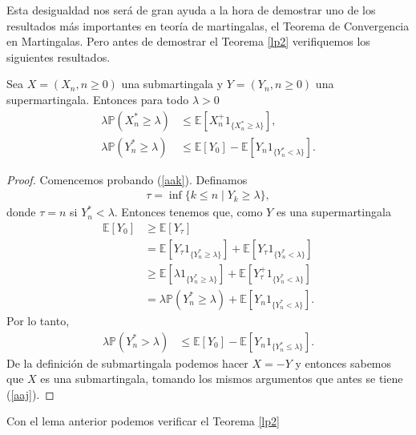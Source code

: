 Esta desigualdad nos será de gran ayuda a la hora de demostrar uno de los resultados más importantes en teoría de martingalas, el Teorema de Convergencia en Martingalas. Pero antes de demostrar el Teorema \ref{lp2} verifiquemos los siguientes resultados.

\begin{lemma}
\label{lemdes2}

Sea $X = (X_n, n \geq 0)$ una submartingala y $Y = (Y_n, n \geq 0)$ una supermartingala. Entonces para todo $\lambda > 0$
	\begin{align}
		\lambda  \mathbb{P}(X_n^{*} \geq \lambda) & \leq \mathbb{E}[X_n^{+} 1_{\{X_n^{*} \geq \lambda\}}] \label{aaj}, \\
		\lambda \mathbb{P}(Y_n^{*} \geq \lambda) & \leq \mathbb{E}[Y_0] - \mathbb{E}[Y_n 1_{\{Y_n^{*} < \lambda\}}]. \label{aak}
	\end{align}
\end{lemma}
\begin{proof}
Comencemos probando (\ref{aak}). Definamos
	\begin{align*}
	\tau = \inf \{k \leq n \mid Y_k \geq \lambda\},
	\end{align*}
donde $\tau = n$ si $Y_n^{*} < \lambda$. Entonces tenemos que, como $Y$ es una supermartingala
	\begin{align*}
	\mathbb{E}[Y_0] & \geq \mathbb{E}[Y_{\tau}] \\
	& = \mathbb{E}[Y_{\tau} 1_{\{Y_n^{*} \geq \lambda\}}] + \mathbb{E}[Y_{\tau} 1_{\{Y_n^{*} < \lambda\}}] \\
	& \geq \mathbb{E}[\lambda 1_{\{Y_n^{*} \geq \lambda\}}] + \mathbb{E}[Y_{\tau}^{+} 1_{\{Y_n^{*} < \lambda\}}] \\
	& = \lambda \mathbb{P}(Y_n^{*} \geq \lambda) + \mathbb{E}[Y_n 1_{\{Y_n^{*} < \lambda\}}].
    \end{align*}
Por lo tanto, 
	\begin{align*}
    \lambda \mathbb{P}(Y_n^{*} > \lambda) & \leq \mathbb{E}[Y_0] - \mathbb{E}[Y_n 1_{\{Y_n^{*} \leq \lambda\}}].
    \end{align*}
De la definición de submartingala podemos hacer $X = - Y$ y entonces sabemos que $X$ es una submartingala, tomando los mismos argumentos que antes se tiene (\ref{aaj}).
\end{proof}
Con el lema anterior podemos verificar el Teorema \ref{lp2}

